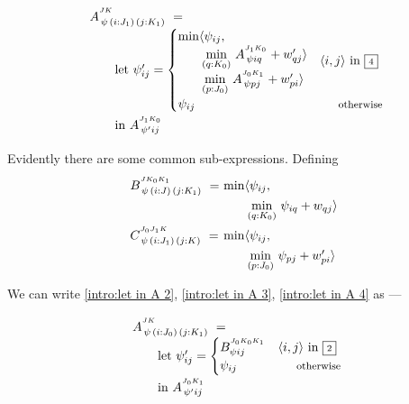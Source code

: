 \begin{equation}\LeftEqNo
\renewcommand\arraystretch{1.5}
\begin{array}{l@{}l}
	A^{^{JK}}_{\,\psi\,(i : J_1)\,(j : K_1)} ~=~ \\
	\qquad
	\textrm{let}~\psi'_{ij} = \begin{cases} 
	  \begin{array}{@{}l@{}l@{}}\min\langle & \psi_{ij}, \\
         & \!\underset{(q:K_0)}\min ~ A^{^{J_1K_0}}_{\,\psi iq} + w'_{qj}\rangle \\
         & \!\underset{(p:J_0)}\min ~ A^{^{J_0K_1}}_{\,\psi pj} + w'_{pi}\rangle \end{array} & \langle i,j\rangle\mbox{ in }\qbox4 \\
	  \psi_{ij} & \otherwise \\
	\end{cases} \\
	\qquad\textrm{in}~
	A^{^{J_1K_0}}_{\,\psi' ij}
\end{array}
\label{intro:let in A 4}
\end{equation}

Evidently there are some common sub-expressions. Defining
\begin{equation}
\renewcommand\arraystretch{1.3}
\begin{array}{l@{}l@{}l}
	B^{^{JK_0K_1}}_{\,\psi\,(i : J)\,(j : K_1)} ~=~ &
	  \min\langle & \psi_{ij}, \\ 
	&  & \!\underset{(q:K_0)}\min ~ \psi_{iq} + w_{qj}\rangle \\[.8em]
	C^{^{J_0J_1K}}_{\,\psi\,(i : J_1)\,(j : K)} ~=~ &
	  \min\langle & \psi_{ij}, \\ 
	&  & \!\underset{(p:J_0)}\min ~ \psi_{pj} + w'_{pi}\rangle 
\end{array}
\label{intro:spec of B,C}
\end{equation}

We can write \eqref{intro:let in A 2}, \eqref{intro:let in A 3}, \eqref{intro:let in A 4} as ---

\begin{equation}\LeftEqNo
\renewcommand\arraystretch{1.5}
\begin{array}{l@{}l}
	A^{^{JK}}_{\,\psi\,(i : J_0)\,(j : K_1)} ~=~ \\
	\qquad
	\textrm{let}~\psi'_{ij} = \begin{cases}
	  B^{^{J_0K_0K_1}}_{\psi ij} & \langle i,j\rangle\mbox{ in }\qbox2 \\
	  \psi_{ij} & \otherwise
	\end{cases} \\
	\qquad\textrm{in}~
	A^{^{J_0K_1}}_{\,\psi' ij}
\end{array}
\label{intro:let in A 2 using B}
\end{equation}

